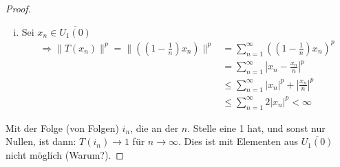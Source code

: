\documentclass[ngerman]{report}
\theoremstyle{plain}%
\theoremstyle{definition}%
\theoremstyle{myStyle}
\newcommand{\df}{\Rightarrow} %
\begin{document}
\begin{enumerate}[(a)]
\begin{proof}
\begin{enumerate}[(i)]
\item Sei $x_n \in \overline{U_1(0)}$
\begin{equation*}
\begin{split}
 \df 
 \|T(x_n)\|^p 
 = \|\left(\left(1-\frac{1}{n}\right)x_n\right)\|^p 
 & = \sum^\infty_{n=1} \left(\left(1-\frac{1}{n}\right)x_n\right)^p 
 \\ & = \sum^\infty_{n=1} | x_n-\frac{x_n}{n}|^p 
 \\ & \leq \sum^\infty_{n=1} |x_n|^p+|\frac{x_n}{n}|^p
 \\ & \leq \sum^\infty_{n=1} 2|x_n|^p < \infty
 \end{split}
\end{equation*}


\end{enumerate}
Mit der Folge (von Folgen) $i_n$, die an der $n.$ Stelle eine 1 hat, und sonst nur Nullen, ist dann: $T(i_n) \longrightarrow 1$ für $n\longrightarrow \infty$. Dies ist mit Elementen aus $\overline{U_1(0)}$ nicht möglich (Warum?).

\end{proof}

\end{enumerate}
\end{document}
